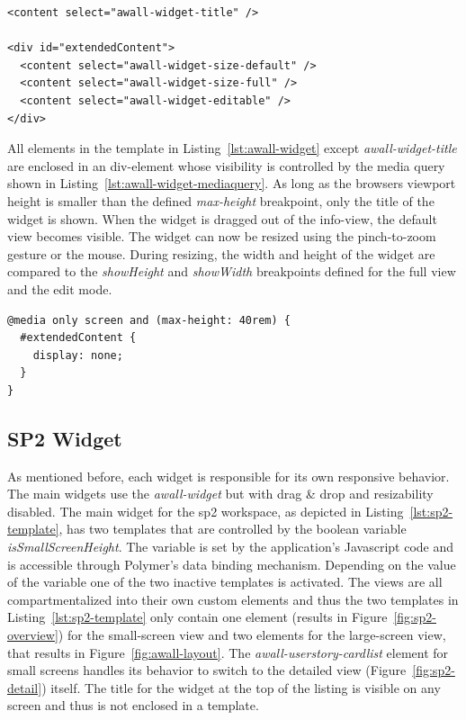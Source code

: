 \documentclass{sigchi}
\begin{document}
\begin{lstlisting}
<content select="awall-widget-title" />

<div id="extendedContent">
  <content select="awall-widget-size-default" />
  <content select="awall-widget-size-full" />
  <content select="awall-widget-editable" />
</div>
\end{lstlisting}


All elements in the template in Listing~\ref{lst:awall-widget} except \textit{awall-widget-title} are enclosed in an div-element whose visibility is controlled by the media query shown in Listing~\ref{lst:awall-widget-mediaquery}.
As long as the browsers viewport height is smaller than the defined \textit{max-height} breakpoint, only the title of the widget is shown.
When the widget is dragged out of the info-view, the default view becomes visible.
The widget can now be resized using the pinch-to-zoom gesture or the mouse.
During resizing, the width and height of the widget are compared to the \textit{showHeight} and \textit{showWidth} breakpoints defined for the full view and the edit mode.


\begin{lstlisting}
@media only screen and (max-height: 40rem) {
  #extendedContent {
    display: none;
  }
}
\end{lstlisting}

\subsection{SP2 Widget}
As mentioned before, each widget is responsible for its own responsive behavior.
The main widgets use the \textit{awall-widget} but with drag \& drop and resizability disabled.
The main widget for the \gls{sp2} workspace, as depicted in Listing~\ref{lst:sp2-template}, has two templates that are controlled by the boolean variable \textit{isSmallScreenHeight}.
The variable is set by the application's Javascript code and is accessible through Polymer's data binding mechanism.
Depending on the value of the variable one of the two inactive templates is activated.
The views are all compartmentalized into their own custom elements and thus the two templates in Listing~\ref{lst:sp2-template} only contain one element (results in Figure~\ref{fig:sp2-overview}) for the small-screen view and two elements for the large-screen view, that results in Figure~\ref{fig:awall-layout}.
The \textit{awall-userstory-cardlist} element for small screens handles its behavior to switch to the detailed view (Figure~\ref{fig:sp2-detail}) itself.
The title for the widget at the top of the listing is visible on any screen and thus is not enclosed in a template.
\end{document}
